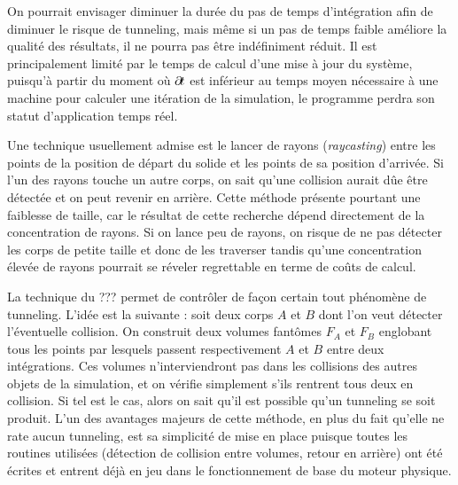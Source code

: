 \begin{figure}
  \centering
  
  \caption{}
  \label{tunneling1}
\end{figure}

On pourrait envisager diminuer la durée du pas de temps d'intégration
afin de diminuer le risque de tunneling, mais même si un pas de temps
faible améliore la qualité des résultats, il ne pourra pas être
indéfiniment réduit. Il est principalement limité par le temps de
calcul d'une mise à jour du système, puisqu'à partir du moment o\`u
$\partial \! t$ est inférieur au temps moyen nécessaire à une machine pour
calculer une itération de la simulation, le programme perdra son
statut d'application temps réel.

Une technique usuellement admise est le lancer de rayons
(\textit{raycasting}) entre les points de la position de départ du
solide et les points de sa position d'arrivée. Si l'un des rayons
touche un autre corps, on sait qu'une collision aurait dûe être
détectée et on peut revenir en arrière. Cette méthode présente
pourtant une faiblesse de taille, car le résultat de cette recherche
dépend directement de la concentration de rayons. Si on lance peu de
rayons, on risque de ne pas détecter les corps de petite taille et
donc de les traverser tandis qu'une concentration élevée de rayons
pourrait se réveler regrettable en terme de coûts de calcul.

\begin{figure}
  \centering
  
  \caption{}
  \label{tunneling2}
\end{figure}

La technique du ??? permet de contrôler de façon certain tout
phénomène de tunneling. L'idée est la suivante : soit deux corps $A$
et $B$ dont l'on veut détecter l'éventuelle collision. On construit
deux volumes fantômes $F_A$ et $F_B$ englobant tous les points par
lesquels passent respectivement $A$ et $B$ entre deux
intégrations. Ces volumes n'interviendront pas dans les collisions des
autres objets de la simulation, et on vérifie simplement s'ils
rentrent tous deux en collision. Si tel est le cas, alors on sait
qu'il est possible qu'un tunneling se soit produit. L'un des avantages
majeurs de cette méthode, en plus du fait qu'elle ne rate aucun
tunneling, est sa simplicité de mise en place puisque toutes les
routines utilisées (détection de collision entre volumes, retour en
arrière) ont été écrites et entrent déjà en jeu dans le fonctionnement
de base du moteur physique.

